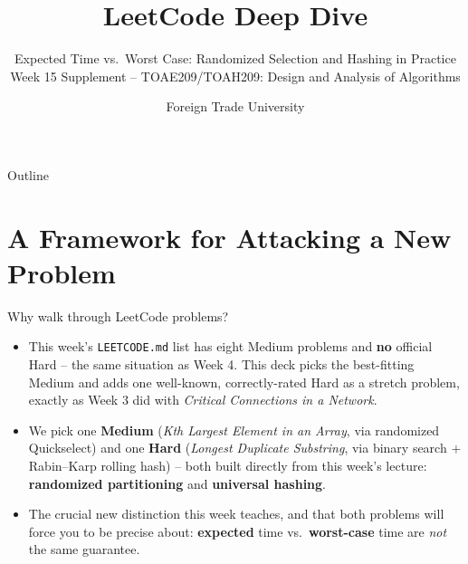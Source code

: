 \documentclass[11pt,aspectratio=169]{beamer}
\title{LeetCode Deep Dive}
\subtitle{Expected Time vs.\ Worst Case: Randomized Selection and Hashing in Practice\\
\small Week 15 Supplement -- TOAE209/TOAH209: Design and Analysis of Algorithms}
\author{Foreign Trade University}
\date{}
\begin{document}
\begin{frame}
  \titlepage
\end{frame}

\begin{frame}{Outline}
  \tableofcontents
\end{frame}

\section{A Framework for Attacking a New Problem}

\begin{frame}{Why walk through LeetCode problems?}
  \begin{itemize}
    \item This week's \texttt{LEETCODE.md} list has eight Medium problems and
    \textbf{no} official Hard -- the same situation as Week 4. This deck picks the
    best-fitting Medium and adds one well-known, correctly-rated Hard as a stretch
    problem, exactly as Week 3 did with \emph{Critical Connections in a Network}.
    \item We pick one \textcolor{blue!50!black}{\textbf{Medium}} (\emph{Kth Largest
    Element in an Array}, via randomized Quickselect) and one
    \textcolor{red!60!black}{\textbf{Hard}} (\emph{Longest Duplicate Substring}, via
    binary search $+$ Rabin--Karp rolling hash) -- both built directly from this week's
    lecture: \textbf{randomized partitioning} and \textbf{universal hashing}.
    \item The crucial new distinction this week teaches, and that both problems will
    force you to be precise about: \textbf{expected} time vs.\ \textbf{worst-case} time
    are \emph{not} the same guarantee.
  \end{itemize}
\end{frame}
\end{document}
